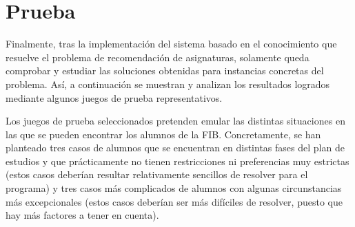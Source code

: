 
\section{Prueba} \label{sec:prueba}

Finalmente, tras la implementación del sistema basado en el conocimiento que 
resuelve el problema de recomendación de asignaturas, solamente queda 
comprobar y estudiar las soluciones obtenidas para instancias concretas del 
problema. Así, a continuación se muestran y analizan los resultados logrados 
mediante algunos juegos de prueba representativos.

Los juegos de prueba seleccionados pretenden emular las distintas situaciones 
en las que se pueden encontrar los alumnos de la FIB. Concretamente, se han 
planteado tres casos de alumnos que se encuentran en distintas fases del plan 
de estudios y que prácticamente no tienen restricciones ni preferencias muy 
estrictas (estos casos deberían resultar relativamente sencillos de resolver 
para el programa) y tres casos más complicados de alumnos con algunas 
circunstancias más excepcionales (estos casos deberían ser más difíciles de 
resolver, puesto que hay más factores a tener en cuenta).


\clearpage

